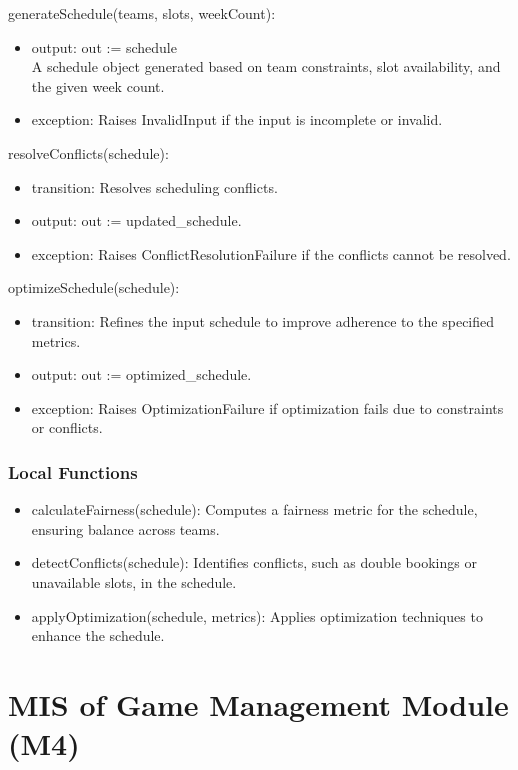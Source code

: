 \documentclass[12pt, titlepage]{article}
\begin{document}
\noindent generateSchedule(teams, slots, weekCount):
\begin{itemize}
  \item output: out := schedule \\ A schedule object generated based on team constraints, slot availability, and the given week count.
  \item exception: Raises InvalidInput if the input is incomplete or invalid.
\end{itemize}

\noindent resolveConflicts(schedule):
\begin{itemize}
  \item transition: Resolves scheduling conflicts.
  \item output: out := updated\_schedule.
  \item exception: Raises ConflictResolutionFailure if the conflicts cannot be resolved.
\end{itemize}

\noindent optimizeSchedule(schedule):
\begin{itemize}
  \item transition: Refines the input schedule to improve adherence to the specified metrics.
  \item output: out := optimized\_schedule.
  \item exception: Raises OptimizationFailure if optimization fails due to constraints or conflicts.
\end{itemize}

\subsubsection{Local Functions}
\begin{itemize}
  \item calculateFairness(schedule): Computes a fairness metric for the schedule, ensuring balance across teams.
  \item detectConflicts(schedule): Identifies conflicts, such as double bookings or unavailable slots, in the schedule.
  \item applyOptimization(schedule, metrics): Applies optimization techniques to enhance the schedule.
\end{itemize}

\newpage

\section{MIS of Game Management Module (M4)} \label{GameManagementModule}
\end{document}
